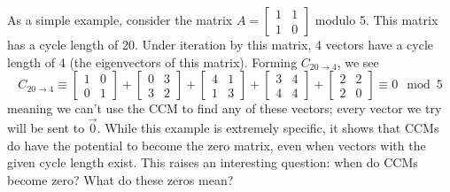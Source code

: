 \documentclass[a4paper, 12pt, reqno]{amsart}
\begin{document}
	As a simple example, consider the matrix $A = 
	\left[
		\begin{smallmatrix}
			1 & 1 \\
			1 & 0
		\end{smallmatrix}
	\right]$ modulo 5. This matrix has a cycle length of 20. Under iteration by this matrix, 4 vectors have a cycle length of 4 (the eigenvectors of this matrix).
	Forming $C_{20 \rightarrow 4}$, we see
	\[
		C_{20 \rightarrow 4} \equiv 
		\begin{bmatrix}
			1 & 0 \\
			0 & 1
		\end{bmatrix} + 
		\begin{bmatrix}
			0 & 3 \\
			3 & 2
		\end{bmatrix} + 
		\begin{bmatrix}
			4 & 1 \\
			1 & 3
		\end{bmatrix} + 
		\begin{bmatrix}
			3 & 4 \\
			4 & 4
		\end{bmatrix} + 
		\begin{bmatrix}
			2 & 2 \\
			2 & 0
		\end{bmatrix} \equiv 0 \mod{5}
	\]
	meaning we can't use the CCM to find any of these vectors; every vector we try will be sent to $\vec{0}$. While this example is extremely specific, it shows that CCMs 
	do have the potential to become the zero matrix, even when vectors with the given cycle length exist. This raises an interesting question: when do CCMs become zero?
	What do these zeros mean? 
	
\end{document}
